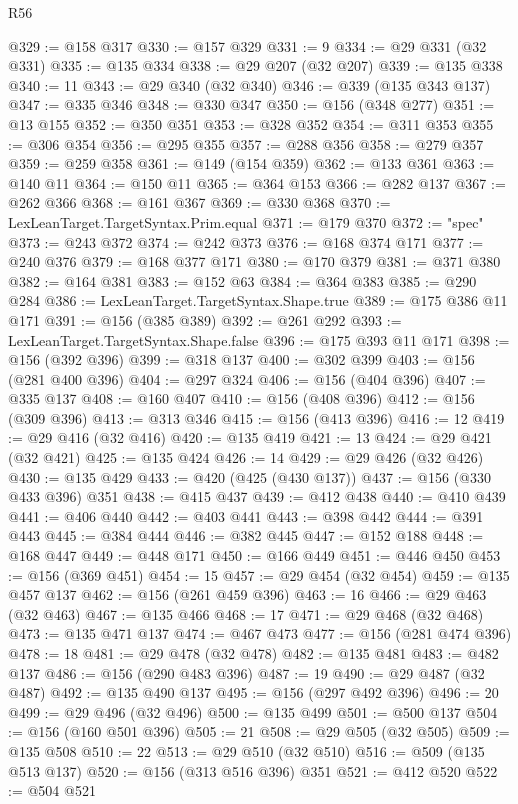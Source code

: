 \begin{lexlean}{R56}
\begin{coremodule}
@329 := @158 @317
@330 := @157 @329
@331 := 9
@334 := @29 @331 (@32 @331)
@335 := @135 @334
@338 := @29 @207 (@32 @207)
@339 := @135 @338
@340 := 11
@343 := @29 @340 (@32 @340)
@346 := @339 (@135 @343 @137)
@347 := @335 @346
@348 := @330 @347
@350 := @156 (@348 @277)
@351 := @13 @155
@352 := @350 @351
@353 := @328 @352
@354 := @311 @353
@355 := @306 @354
@356 := @295 @355
@357 := @288 @356
@358 := @279 @357
@359 := @259 @358
@361 := @149 (@154 @359)
@362 := @133 @361
@363 := @140 @11
@364 := @150 @11
@365 := @364 @153
@366 := @282 @137
@367 := @262 @366
@368 := @161 @367
@369 := @330 @368
@370 := LexLeanTarget.TargetSyntax.Prim.equal
@371 := @179 @370
@372 := "spec"
@373 := @243 @372
@374 := @242 @373
@376 := @168 @374 @171
@377 := @240 @376
@379 := @168 @377 @171
@380 := @170 @379
@381 := @371 @380
@382 := @164 @381
@383 := @152 @63
@384 := @364 @383
@385 := @290 @284
@386 := LexLeanTarget.TargetSyntax.Shape.true
@389 := @175 @386 @11 @171
@391 := @156 (@385 @389)
@392 := @261 @292
@393 := LexLeanTarget.TargetSyntax.Shape.false
@396 := @175 @393 @11 @171
@398 := @156 (@392 @396)
@399 := @318 @137
@400 := @302 @399
@403 := @156 (@281 @400 @396)
@404 := @297 @324
@406 := @156 (@404 @396)
@407 := @335 @137
@408 := @160 @407
@410 := @156 (@408 @396)
@412 := @156 (@309 @396)
@413 := @313 @346
@415 := @156 (@413 @396)
@416 := 12
@419 := @29 @416 (@32 @416)
@420 := @135 @419
@421 := 13
@424 := @29 @421 (@32 @421)
@425 := @135 @424
@426 := 14
@429 := @29 @426 (@32 @426)
@430 := @135 @429
@433 := @420 (@425 (@430 @137))
@437 := @156 (@330 @433 @396) @351
@438 := @415 @437
@439 := @412 @438
@440 := @410 @439
@441 := @406 @440
@442 := @403 @441
@443 := @398 @442
@444 := @391 @443
@445 := @384 @444
@446 := @382 @445
@447 := @152 @188
@448 := @168 @447
@449 := @448 @171
@450 := @166 @449
@451 := @446 @450
@453 := @156 (@369 @451)
@454 := 15
@457 := @29 @454 (@32 @454)
@459 := @135 @457 @137
@462 := @156 (@261 @459 @396)
@463 := 16
@466 := @29 @463 (@32 @463)
@467 := @135 @466
@468 := 17
@471 := @29 @468 (@32 @468)
@473 := @135 @471 @137
@474 := @467 @473
@477 := @156 (@281 @474 @396)
@478 := 18
@481 := @29 @478 (@32 @478)
@482 := @135 @481
@483 := @482 @137
@486 := @156 (@290 @483 @396)
@487 := 19
@490 := @29 @487 (@32 @487)
@492 := @135 @490 @137
@495 := @156 (@297 @492 @396)
@496 := 20
@499 := @29 @496 (@32 @496)
@500 := @135 @499
@501 := @500 @137
@504 := @156 (@160 @501 @396)
@505 := 21
@508 := @29 @505 (@32 @505)
@509 := @135 @508
@510 := 22
@513 := @29 @510 (@32 @510)
@516 := @509 (@135 @513 @137)
@520 := @156 (@313 @516 @396) @351
@521 := @412 @520
@522 := @504 @521

\end{coremodule}
\end{lexlean}
